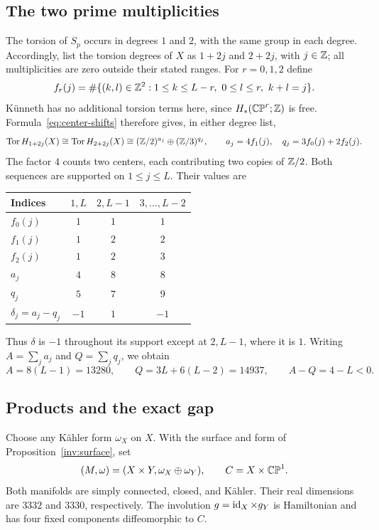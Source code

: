 \subsection{The two prime multiplicities}
The torsion of $S_p$ occurs in degrees $1$ and $2$, with the same
group in each degree. Accordingly, list the torsion degrees of $X$
as $1+2j$ and $2+2j$, with $j\in\mathbb Z$; all multiplicities are zero
outside their stated ranges. For $r=0,1,2$ define
\begin{equation}
 f_r(j)=\#\{(k,l)\in\mathbb Z^2:1\leq k\leq L-r,
                         \ 0\leq l\leq r,\ k+l=j\}.
 \label{eq:f-r}
\end{equation}
K\"unneth has no additional torsion terms here, since
$H_*(\mathbb {CP}^r;\mathbb Z)$ is free. Formula~\eqref{eq:center-shifts} therefore
gives, in either degree list,
\begin{equation}
 \operatorname{Tor} H_{1+2j}(X)\cong\operatorname{Tor} H_{2+2j}(X)
 \cong(\mathbb Z/2)^{a_j}\oplus(\mathbb Z/3)^{q_j},\qquad
 a_j=4f_1(j),\quad q_j=3f_0(j)+2f_2(j).
 \label{eq:new-profiles}
\end{equation}
The factor $4$ counts two centers, each contributing two copies
of $\mathbb Z/2$. Both sequences are supported on $1\leq j\leq L$.
Their values are
\begin{center}
\begin{tabular}{@{}lccc@{}}
\toprule
Indices & $1,L$ & $2,L-1$ & $3,\ldots,L-2$\\
\midrule
$f_0(j)$ & $1$ & $1$ & $1$\\
$f_1(j)$ & $1$ & $2$ & $2$\\
$f_2(j)$ & $1$ & $2$ & $3$\\
$a_j$ & $4$ & $8$ & $8$\\
$q_j$ & $5$ & $7$ & $9$\\
$\delta_j=a_j-q_j$ & $-1$ & $1$ & $-1$\\
\bottomrule
\end{tabular}
\end{center}
Thus $\delta$ is $-1$ throughout its support except at $2,L-1$,
where it is $1$. Writing $A=\sum_j a_j$ and $Q=\sum_jq_j$, we obtain
\begin{equation}
 A=8(L-1)=13280,\qquad Q=3L+6(L-2)=14937,
 \qquad A-Q=4-L<0.
 \label{eq:totals}
\end{equation}

\subsection{Products and the exact gap}
Choose any K\"ahler form $\omega_X$ on $X$. With the surface and
form of Proposition~\ref{inv:surface}, set
\[
 (M,\omega)=(X\times Y,\omega_X\oplus\omega_Y),
 \qquad C=X\times\mathbb {CP}^1.
\]
Both manifolds are simply connected, closed, and K\"ahler. Their
real dimensions are $3332$ and $3330$, respectively. The involution
$g=\operatorname{id}_X\times g_Y$ is Hamiltonian and has four fixed components
diffeomorphic to $C$.

